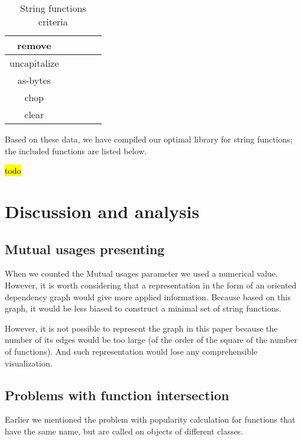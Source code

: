 \documentclass[anonymous,sigplan,review,11pt,nonacm,natbib=false]{acmart}
\begin{document}
\begin{table*}[]
\begin{tabular}{|c||c|c|c|c|}
            remove &  &  &  & \\ \hline

            uncapitalize &  &  &  & \\ \hline

            as-bytes &  &  &  & \\ \hline

            chop &  &  &  & \\ \hline

            clear &  &  &  & \\ \hline


        \end{tabular}
        \caption{String functions criteria}
        \label{tab:my_label}
    \end{table*}

    Based on these data, we have compiled our optimal library for string functions; the included functions are listed below.

    \hl{todo}

    \section{Discussion and analysis}

    \subsection{Mutual usages presenting}

    When we counted the Mutual usages parameter we used a numerical value. However, it is worth considering that a representation in the form of an oriented dependency graph would give more applied information. Because based on this graph, it would be less biased to construct a minimal set of string functions.

    However, it is not possible to represent the graph in this paper because the number of its edges would be too large (of the order of the square of the number of functions). And such representation would lose any comprehensible visualization.

    \subsection{Problems with function intersection}

    Earlier we mentioned the problem with popularity calculation for functions that have the same name, but are called on objects of different classes.
\end{document}
